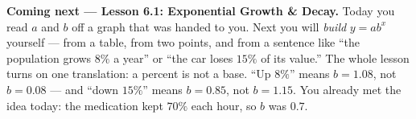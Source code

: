 \documentclass[10pt]{article}
\begin{document}
\begin{spiralbox}
\textbf{Coming next --- Lesson 6.1: Exponential Growth \& Decay.} Today you read $a$ and $b$ off a
graph that was handed to you. Next you will \emph{build} $y=ab^{x}$ yourself --- from a table, from
two points, and from a sentence like ``the population grows $8\%$ a year'' or ``the car loses $15\%$
of its value.'' The whole lesson turns on one translation: a percent is not a base. ``Up $8\%$''
means $b=1.08$, not $b=0.08$ --- and ``down $15\%$'' means $b=0.85$, not $b=1.15$. You already met
the idea today: the medication kept $70\%$ each hour, so $b$ was $0.7$.
\end{spiralbox}
\end{document}
